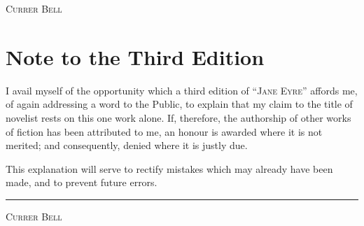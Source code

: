 {\textit{} \hfill \textsc{Currer Bell}}

\chapter{Note to the Third Edition}

I avail myself of the opportunity which a third edition of \enquote{\textsc{Jane
Eyre}} affords me, of again addressing a word to the Public, to explain
that my claim to the title of novelist rests on this one work alone. 
If, therefore, the authorship of other works of fiction has been
attributed to me, an honour is awarded where it is not merited; and
consequently, denied where it is justly due.

This explanation will serve to rectify mistakes which may already have
been made, and to prevent future errors.

\plainbreak{2}

{\textit{} \hfill \textsc{Currer Bell}}
